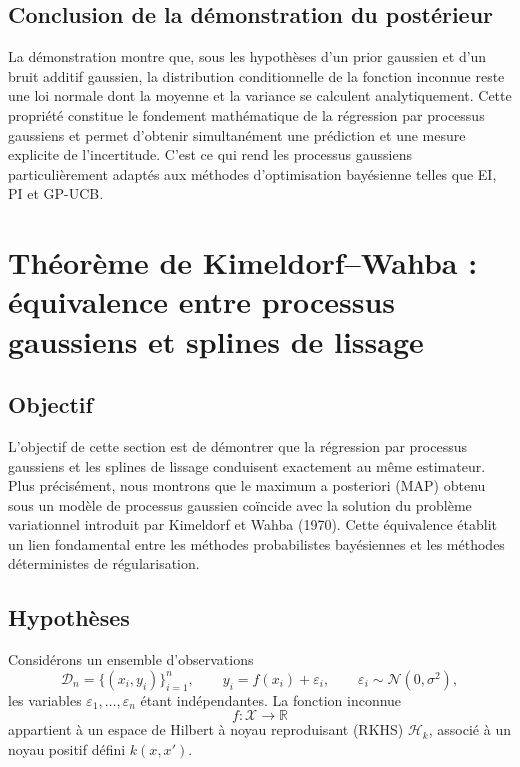 \documentclass[12pt]{article}
\newcommand{\R}{\mathbb{R}}
\newcommand{\N}{\mathcal{N}}
\newcommand{\X}{\mathcal{X}}
\newcommand{\Hk}{\mathcal{H}_k}
\newcommand{\D}{\mathcal{D}}
\begin{document}
\subsection*{Conclusion de la démonstration du postérieur}

La démonstration montre que, sous les hypothèses d'un prior gaussien et d'un bruit
additif gaussien, la distribution conditionnelle de la fonction inconnue reste une
loi normale dont la moyenne et la variance se calculent analytiquement. Cette
propriété constitue le fondement mathématique de la régression par processus
gaussiens et permet d'obtenir simultanément une prédiction et une mesure explicite
de l'incertitude. C'est ce qui rend les processus gaussiens particulièrement
adaptés aux méthodes d'optimisation bayésienne telles que EI, PI et GP-UCB.

\newpage
\section*{Théorème de Kimeldorf--Wahba : équivalence entre processus gaussiens et splines de lissage}

\subsection*{Objectif}

L'objectif de cette section est de démontrer que la régression par processus
gaussiens et les splines de lissage conduisent exactement au même estimateur. Plus
précisément, nous montrons que le maximum a posteriori (MAP) obtenu sous un modèle
de processus gaussien coïncide avec la solution du problème variationnel introduit
par Kimeldorf et Wahba (1970). Cette équivalence établit un lien fondamental entre
les méthodes probabilistes bayésiennes et les méthodes déterministes de
régularisation.

\subsection*{Hypothèses}

Considérons un ensemble d'observations
\[
\D_n = \{(x_i,y_i)\}_{i=1}^n,
\qquad
y_i = f(x_i) + \varepsilon_i,
\qquad
\varepsilon_i \sim \N(0,\sigma^2),
\]
les variables $\varepsilon_1,\dots,\varepsilon_n$ étant indépendantes. La fonction
inconnue
\[
f : \X \to \R
\]
appartient à un espace de Hilbert à noyau reproduisant (RKHS) $\Hk$, associé à un
noyau positif défini $k(x,x')$.
\end{document}
